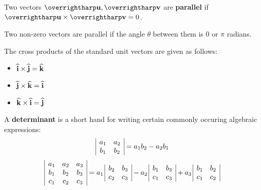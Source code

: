 \documentclass[letterpaper, twoside, 12pt]{book}
\begin{document}
\begin{definition}
  Two vectors $\harpvec{u},\harpvec{v}$ are \textbf{parallel} if
  $\harpvec{u} \times \harpvec{v} = 0$.
\end{definition}

\begin{theorem}
  Two non-zero vectors are parallel if the angle $\theta$ between them
  is $0$ or $\pi$ radians.
\end{theorem}

\begin{definition}
  The cross products of the standard unit vectors are given as follows:
  \begin{itemize}
    \item $\mathbf{\widehat{i}} \times \mathbf{\widehat{j}} = \mathbf{\widehat{k}}$
    \item $\mathbf{\widehat{j}} \times \mathbf{\widehat{k}} = \mathbf{\widehat{i}}$
    \item $\mathbf{\widehat{k}} \times \mathbf{\widehat{i}} = \mathbf{\widehat{j}}$
  \end{itemize}
\end{definition}

\begin{definition}
  A \textbf{determinant} is a short hand for writing certain commonly
  occuring algebraic expressions:
    \[
      \begin{array}{|c c|}
      a_1 & a_2 \\
      b_1 & b_2 \\
      \end{array}
        =
      a_1b_2 - a_2b_1
    \]
    \[
      \begin{array}{|c c c|}
      a_1 & a_2 & a_3 \\
      b_1 & b_2 & b_3 \\
      c_1 & c_2 & c_3 \\
      \end{array}
        =
      a_1 \,
      \begin{array}{|c c|}
      b_2 & b_3 \\
      c_2 & c_3 \\
      \end{array}
        -
      a_2 \,
      \begin{array}{|c c|}
      b_1 & b_3 \\
      c_1 & c_3 \\
      \end{array}
        +
      a_3 \,
      \begin{array}{|c c|}
      b_1 & b_2 \\
      c_1 & c_2 \\
      \end{array}
    \]
\end{definition}
\end{document}
